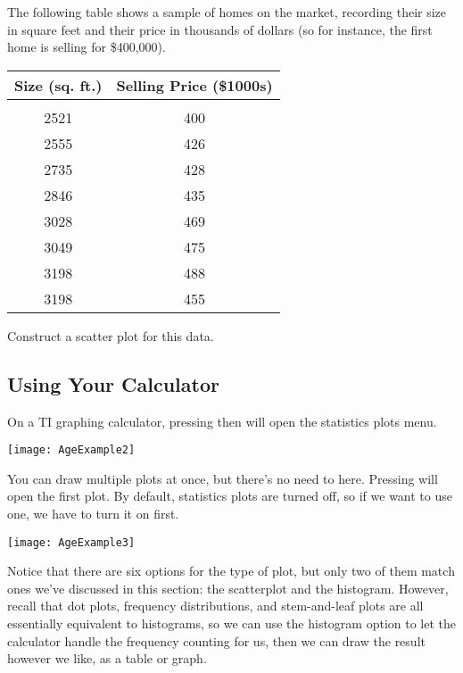 \begin{try}
The following table shows a sample of homes on the market, recording their size in square feet and their price in thousands of dollars (so for instance, the first home is selling for \$400,000).
\begin{center}
\begin{tabular}{c | c}
Size (sq. ft.) & Selling Price (\$1000s)\\
\hline
\\
2521 & 400\\
2555 & 426\\
2735 & 428\\
2846 & 435\\
3028 & 469\\
3049 & 475\\
3198 & 488\\
3198 & 455\\
\end{tabular}
\end{center}

Construct a scatter plot for this data.
\end{try}
\vfill
\pagebreak

\subsection{Using Your Calculator}
On a TI graphing calculator, pressing  then  will open the statistics plots menu.
\begin{center}
\texttt{[image: AgeExample2]}
\end{center}

You can draw multiple plots at once, but there's no need to here.  Pressing  will open the first plot.  By default, statistics plots are turned off, so if we want to use one, we have to turn it on first.
\begin{center}
\texttt{[image: AgeExample3]}
\end{center}

Notice that there are six options for the type of plot, but only two of them match ones we've discussed in this section: the scatterplot and the histogram.  However, recall that dot plots, frequency distributions, and stem-and-leaf plots are all essentially equivalent to histograms, so we can use the histogram option to let the calculator handle the frequency counting for us, then we can draw the result however we like, as a table or graph.

